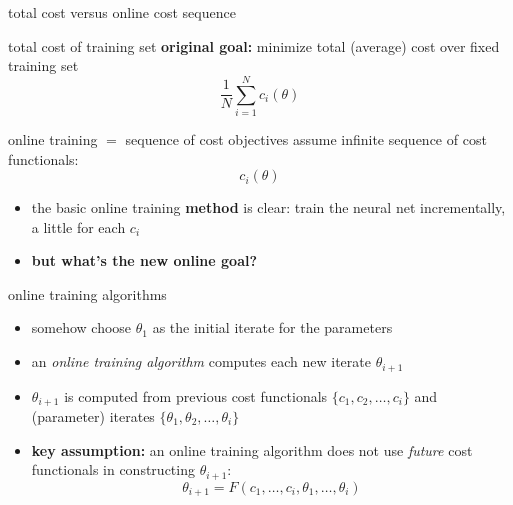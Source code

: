 \documentclass[xcolor={svgnames},
               hyperref={colorlinks,citecolor=DeepPink4,linkcolor=FireBrick,urlcolor=Maroon}]
               {beamer}
\begin{document}
\begin{frame}{total cost versus online cost sequence}

\begin{block}{total cost of training set}
\textbf{original goal:}  minimize total (average) cost over fixed training set
    $$\frac{1}{N} \sum_{i=1}^N c_i(\theta)$$
\end{block}

\begin{block}{online training $=$ sequence of cost objectives}
assume infinite sequence of cost functionals:
    $$c_i(\theta)$$
\end{block}

\begin{itemize}
\item the basic online training \textbf{method} is clear: train the neural net incrementally, a little for each $c_i$
\item \textbf{but what's the new online goal?}
\end{itemize}

\end{frame}


\begin{frame}{online training algorithms}

\begin{itemize}
\item somehow choose $\theta_1$ as the initial iterate for the parameters
\item an \emph{online training algorithm} computes each new iterate $\theta_{i+1}$
\item $\theta_{i+1}$ is computed from previous cost functionals $\{c_1,c_2,\dots,c_i\}$ and (parameter) iterates $\{\theta_1,\theta_2,\dots,\theta_i\}$
\item \textbf{key assumption:} an online  training algorithm does not use \emph{future} cost functionals in constructing $\theta_{i+1}$:
    $$\theta_{i+1} = F(c_1,\dots,c_i,\theta_1,\dots,\theta_i)$$
\end{itemize}
\end{frame}
\end{document}
